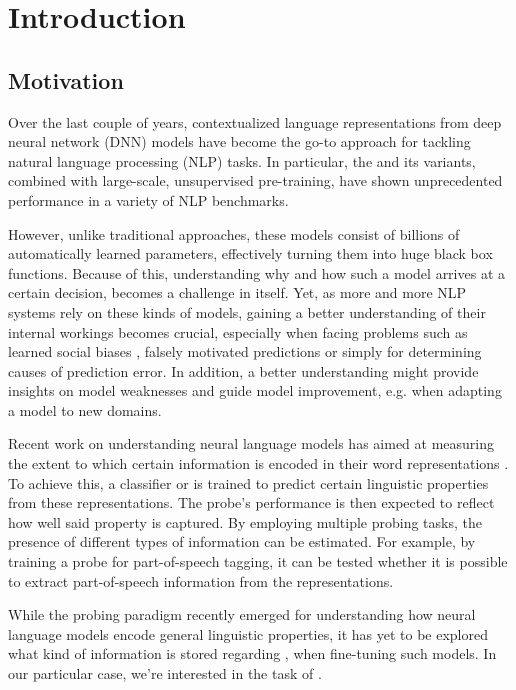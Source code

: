 \chapter{Introduction}
\section{Motivation}
Over the last couple of years, contextualized language representations from deep neural network (DNN) models have become the go-to approach for tackling natural language processing (NLP) tasks. In particular, the  \cite{vaswani2017attention} and its variants, combined with large-scale, unsupervised pre-training, have shown unprecedented performance in a variety of NLP benchmarks.

However, unlike traditional approaches, these models consist of billions of automatically learned parameters, effectively turning them into huge black box functions. Because of this, understanding why and how such a model arrives at a certain decision, becomes a challenge in itself. Yet, as more and more NLP systems rely on these kinds of models, gaining a better understanding of their internal workings becomes crucial, especially when facing problems such as learned social biases \cite{Nadeem2021StereoSetMS,Bender2021OnTD, kurita2019measuring}, falsely motivated predictions \cite{10.1145/2939672.2939778, DBLP:journals/corr/abs-1802-00614} or simply for determining causes of prediction error. In addition, a better understanding might provide insights on model weaknesses and guide model improvement, e.g. when adapting a model to new domains.

Recent work on understanding neural language models has aimed at measuring the extent to which certain information is encoded in their word representations \cite{tenney-etal-2019-bert,Tenney2019WhatDY,DBLP:journals/corr/abs-1909-03368}. To achieve this, a  classifier or  is trained to predict certain linguistic properties from these representations. The probe's performance is then expected to reflect how well said property is captured. By employing multiple probing tasks, the presence of different types of information can be estimated. For example, by training a probe for part-of-speech tagging, it can be tested whether it is possible to extract part-of-speech information from the representations.

While the probing paradigm recently emerged for understanding how neural language models encode general linguistic properties, it has yet to be explored what kind of information is stored regarding , when fine-tuning such models. In our particular case, we're interested in the task of .




